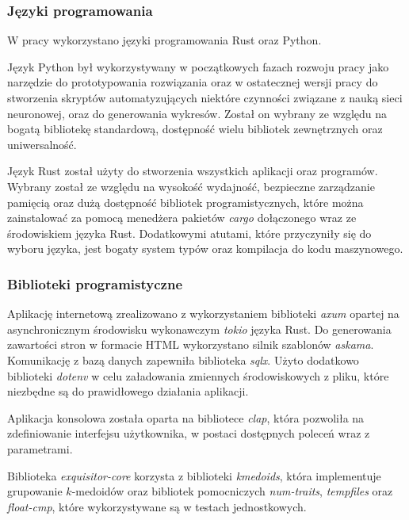 \documentclass{article}
\newcommand{\temporary}[1]{
    \begin{tcolorbox}[colframe=red, colback=white, title={\textbf{WERSJA PO POLSKU}}, sharp corners=south]
        #1
    \end{tcolorbox}
}
\begin{document}
            \temporary{
                \subsubsection{Języki programowania}

            W pracy wykorzystano języki programowania Rust\cite{Rust} oraz Python\cite{Python}.

            Język Python był wykorzystywany w początkowych fazach rozwoju pracy jako narzędzie do prototypowania rozwiązania oraz w ostatecznej wersji pracy do stworzenia skryptów automatyzujących niektóre czynności związane z nauką sieci neuronowej, oraz do generowania wykresów. Został on wybrany ze względu na bogatą bibliotekę standardową, dostępność wielu bibliotek zewnętrznych oraz uniwersalność.

            Język Rust został użyty do stworzenia wszystkich aplikacji oraz programów. Wybrany został ze względu na wysokość wydajność, bezpieczne zarządzanie pamięcią oraz dużą dostępność bibliotek programistycznych, które można zainstalować za pomocą menedżera pakietów \textit{cargo}\cite{Rust:cargo} dołączonego wraz ze środowiskiem języka Rust. Dodatkowymi atutami, które przyczyniły się do wyboru języka, jest bogaty system typów oraz kompilacja do kodu maszynowego.

        \subsubsection{Biblioteki programistyczne}

            Aplikację internetową zrealizowano z wykorzystaniem biblioteki \textit{axum}\cite{Rust:axum} opartej na asynchronicznym środowisku wykonawczym \textit{tokio}\cite{Rust:tokio} języka Rust.
            Do generowania zawartości stron w formacie HTML wykorzystano silnik szablonów \textit{askama}\cite{Rust:askama}. Komunikację z bazą danych zapewniła biblioteka \textit{sqlx}\cite{Rust:sqlx}. Użyto dodatkowo biblioteki \textit{dotenv}\cite{Rust:dotenv} w celu załadowania zmiennych środowiskowych z pliku, które niezbędne są do prawidłowego działania aplikacji.

            Aplikacja konsolowa została oparta na bibliotece \textit{clap}\cite{Rust:clap}, która pozwoliła na zdefiniowanie interfejsu użytkownika, w postaci dostępnych poleceń wraz z parametrami.

            Biblioteka \textit{exquisitor-core} korzysta z biblioteki \textit{kmedoids}\cite{Schubert:2022}, która implementuje grupowanie $k$-medoidów oraz bibliotek pomocniczych \textit{num-traits}, \textit{tempfiles} oraz \textit{float-cmp}, które wykorzystywane są w testach jednostkowych.

}
\end{document}
